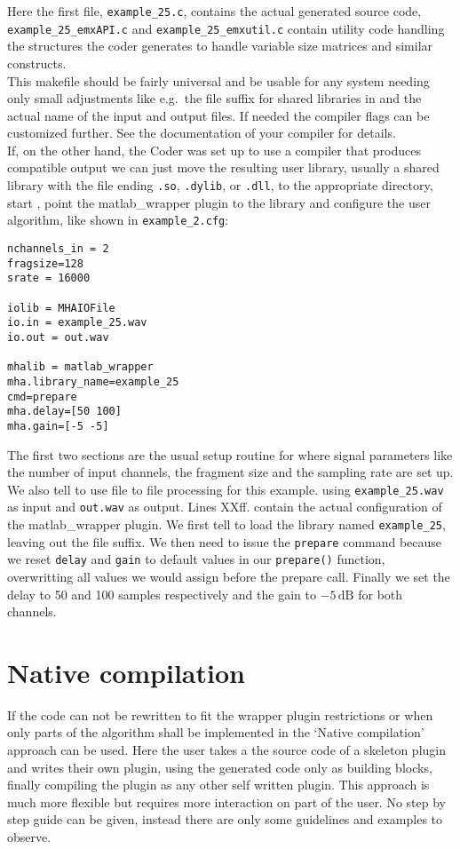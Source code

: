 \documentclass[11pt,a4paper,twoside]{article}
\newcommand{\+}{\discretionary{\mbox{\scriptsize$\hookleftarrow$}}{}{}}
\begin{document}
Here the first file, \texttt{example\_25.c}, contains the actual
generated source code, \texttt{example\_25\_emxAPI.c} and
\texttt{example\_25\_emxutil.c} contain utility code handling the structures the
\Matlab{} coder generates to handle variable size matrices and similar
constructs. \\
This makefile should be fairly universal and be usable for any system needing only 
small adjustments like e.g.\ the file suffix for shared libraries in and the actual 
name of the input and output files. If needed the compiler flags can be customized further.
See the documentation of your compiler for details. \\
If, on the other hand, the \Matlab{} Coder was set up to use a compiler that produces \mha{} compatible
output we can just move the resulting user library, usually a shared library with the file ending
\texttt{.so}, \texttt{.dylib}, or \texttt{.dll}, to the appropriate directory, start \mha{},
point the matlab\_wrapper plugin to the library and configure the user
algorithm, like shown in \texttt{example\_2.cfg}:
\begin{lstlisting}
nchannels_in = 2
fragsize=128
srate = 16000

iolib = MHAIOFile
io.in = example_25.wav
io.out = out.wav

mhalib = matlab_wrapper
mha.library_name=example_25
cmd=prepare
mha.delay=[50 100]
mha.gain=[-5 -5]
\end{lstlisting}
The first two sections are the usual setup routine for \mha{} where signal
parameters like the number of input channels, the fragment size and the sampling
rate are set up. We also tell \mha{} to use file to file processing for this
example. using \texttt{example\_25.wav} as input and \texttt{out.wav} as output.
Lines XXff. contain the actual configuration of the matlab\_wrapper plugin. We
first tell \mha{} to load the library named \texttt{example\_25}, leaving out the
file suffix. We then need to issue the \texttt{prepare} command because we reset
\texttt{delay} and \texttt{gain} to default values in our \texttt{prepare()}
function, overwritting all values we would assign before the prepare call.
Finally we set the delay to 50 and 100 samples respectively and the
gain to $-5\,\mathrm{dB}$ for both channels.

\section{Native compilation}\label{sec:native compilation}
If the code can not be rewritten to fit the wrapper plugin restrictions or when
only parts of the algorithm shall be implemented in \Matlab{} the `Native
compilation' approach can be used.
Here the user takes a the source code of a skeleton \mha{} plugin and writes
their own plugin, using the generated code only as building blocks,
finally compiling the plugin as any other self written \mha{} plugin.
This approach is much more flexible but requires more interaction
on part of the user. No step by step guide can be given, instead there are only
some guidelines and examples to observe. 
\end{document}
